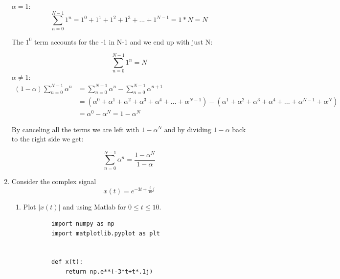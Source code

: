 \documentclass{article}
\begin{document}
\begin{enumerate}
    \textbf{$\alpha = 1:$}
    \begin{equation}
        \sum_{n=0}^{N-1}1^n = 1^0 + 1^1 + 1^2 + 1^3 + ... + 1^{N-1} = 1 * N = N 
    \end{equation}
    \begin{center}
        The $1^0$ term accounts for the -1 in N-1 and we end up with just N:
    \end{center}
    \begin{equation}
        \boxed{\sum_{n=0}^{N-1}1^n = N}
    \end{equation}
    \textbf{$\alpha \ne 1:$}
    \begin{align}
        (1 - \alpha) \sum_{n=0}^{N-1}\alpha^n &= \sum_{n=0}^{N-1}\alpha^n - \sum_{n=0}^{N-1}\alpha^{n+1}\\
        &= (\alpha^0 + \alpha^1 + \alpha^2 + \alpha^3 + \alpha^4 + ... + \alpha^{N-1}) - (\alpha^1 + \alpha^2 + \alpha^3 + \alpha^4 + ... + \alpha^{N-1} + \alpha^N)\\
        &= \alpha^0 - \alpha^N  = 1 - \alpha^N 
    \end{align}
    \begin{center}
        By canceling all the terms we are left with $1 - \alpha^N$ and by dividing $1 - \alpha$ back to the right side we get:
    \end{center}
    \begin{equation}
        \boxed{\sum_{n=0}^{N-1}\alpha^n  = \frac{1 - \alpha^N}{1 - \alpha}}
    \end{equation}
    \newpage
    \item Consider the complex signal
    \begin{equation}
        x(t) = e^{-3t+\frac{t}{10}j}
    \end{equation}
    \begin{enumerate}
        \item Plot $\lvert x(t) \lvert$ and   using Matlab for $0 \leq t \leq 10$.
        \lstset{language=Python}
        \lstset{frame=lines}
        \lstset{basicstyle=\footnotesize}
        \begin{lstlisting}
        import numpy as np
        import matplotlib.pyplot as plt
        
        
        def x(t):
            return np.e**(-3*t+t*.1j)
        

\end{lstlisting}
\end{enumerate}
\end{enumerate}
\end{document}

